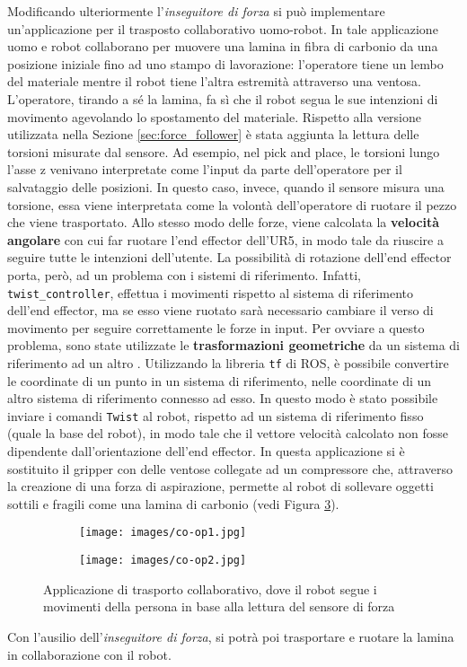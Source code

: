 Modificando ulteriormente l'\textit{inseguitore di forza} si pu\`{o} implementare un'applicazione 
per il trasposto collaborativo uomo-robot\footnotemark{}. 
In tale applicazione uomo e robot collaborano per muovere una lamina in fibra di carbonio da una posizione iniziale fino ad uno stampo 
di lavorazione: l'operatore tiene un lembo del materiale mentre il robot tiene l'altra estremit\`{a} attraverso una ventosa. 
L'operatore, tirando a s\'{e} la lamina, fa s\`{i} che il robot segua le sue intenzioni di movimento agevolando lo spostamento del materiale.
Rispetto alla versione utilizzata nella Sezione \ref{sec:force_follower} \`{e} stata aggiunta 
la lettura delle torsioni misurate dal sensore. 
Ad esempio, nel pick and place, le torsioni lungo l'asse z venivano interpretate come l'input da parte dell'operatore per il salvataggio 
delle posizioni. In questo caso, invece, quando il sensore misura una torsione, essa viene interpretata come la volont\`{a} 
dell'operatore di ruotare il pezzo che viene trasportato.
Allo stesso modo delle forze, viene calcolata la \textbf{velocit\`{a} angolare} 
con cui far ruotare l'end effector dell'UR5, in modo tale da riuscire a seguire tutte le intenzioni dell'utente. 
La possibilit\`{a} di rotazione dell'end effector porta, per\`{o}, ad un problema con i sistemi di riferimento. 
Infatti, \verb|twist_controller|, effettua i movimenti rispetto al sistema di riferimento dell'end effector, ma se esso viene ruotato 
sar\`{a} necessario cambiare il verso di movimento per seguire correttamente le forze in input. Per ovviare a questo 
problema, sono state utilizzate le \textbf{trasformazioni geometriche} da un sistema di riferimento ad un altro \cite{foote2013tf}. 
Utilizzando la libreria \verb|tf| di ROS, \`{e} possibile convertire le coordinate di un punto in un sistema di riferimento, nelle 
coordinate di un altro sistema di riferimento connesso ad esso. In questo modo \`{e} stato possibile inviare i comandi 
\verb|Twist| al robot, rispetto ad un sistema di riferimento fisso (quale la base del robot), in modo tale che il vettore velocit\`{a} 
calcolato non fosse dipendente dall'orientazione dell'end effector. 
In questa applicazione si \`{e} sostituito il gripper con delle ventose collegate ad un compressore che, attraverso la creazione di 
una forza di aspirazione, permette al robot di sollevare oggetti sottili e fragili come una lamina di carbonio (vedi Figura \ref{fig:co-op}).
\begin{figure}[H]
    \centering
    \begin{subfigure}[b]{0.45\textwidth}
        \texttt{[image: images/co-op1.jpg]}
        \label{fig:co-op1}
    \end{subfigure}
    \qquad
    \begin{subfigure}[b]{0.45\textwidth}
        \texttt{[image: images/co-op2.jpg]}
        \label{fig:co-op2}
    \end{subfigure}
    \caption{Applicazione di trasporto collaborativo, dove il robot segue i movimenti della persona in base alla lettura del sensore di forza}\label{fig:co-op}
\end{figure}
Con l'ausilio dell'\textit{inseguitore di forza}, si potr\`{a} poi trasportare e ruotare la lamina in collaborazione con il robot. 
